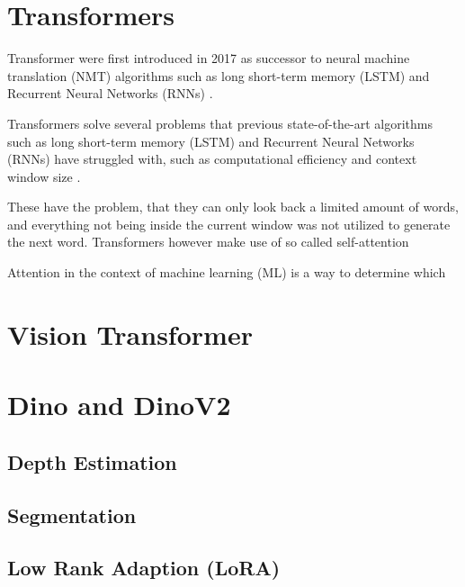 \section{Transformers}
Transformer were first introduced in 2017 as successor to neural machine translation  (NMT) algorithms such as  long short-term memory (LSTM) and Recurrent Neural Networks (RNNs) \cite{Vaswani2017}. 

Transformers solve several problems that previous state-of-the-art algorithms such as long short-term memory (LSTM) and Recurrent Neural Networks (RNNs) have struggled with, such as computational efficiency and context window size \cite[p~609]{Geron2022}.

These have the problem, that they can only look back a limited amount of words, and everything not being inside the current window was not utilized to generate the next word.
Transformers however make use of so called self-attention

Attention in the context of machine learning (ML) is a way to determine which 
\section{Vision Transformer}
\section{Dino and DinoV2}
\subsection{Depth Estimation}
\subsection{Segmentation}

\subsection{Low Rank Adaption (LoRA)}
